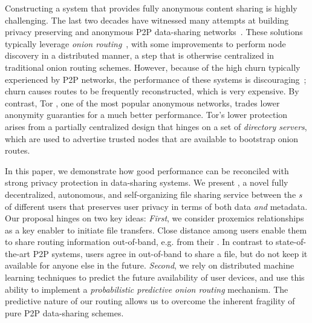 Constructing a system that provides fully anonymous content sharing is highly
challenging. The last two decades have witnessed many attempts at building privacy preserving and anonymous P2P data-sharing
networks~\cite{Clarke:2001,Gnunet2002,Freedman:2002,Nambiar:2006,Rennhard:2002}.
These solutions typically leverage \emph{onion
 routing}~\cite{Chaum:1981}, with some improvements to perform node
 discovery in a distributed manner, a step that is otherwise
centralized in traditional onion routing schemes. However, because of the high
churn typically experienced by P2P networks, the performance of these systems is
discouraging~\cite{LeBlond:2013}; churn causes routes to be frequently
reconstructed, which is very expensive. By contrast, Tor
\cite{Dingledine:2004}, one of the most popular anonymous networks,
trades lower anonymity guaranties for a much better performance. Tor's lower protection arises from
a partially centralized design that hinges on a set of \emph{directory
servers}, which are used to advertise trusted nodes that are available to bootstrap onion
routes. 

In this paper, we demonstrate how good performance can be reconciled with strong privacy protection in data-sharing systems. We present \name{}, a novel fully decentralized, autonomous,
and self-organizing file sharing service between the \squad{}\emph{s} of different users that preserves user privacy
in terms of both data \emph{and} metadata. Our proposal hinges on two key ideas: \emph{First}, we consider proxemics relationships as a key enabler to initiate file
transfers. Close distance among users enable them to share
routing information out-of-band, e.g. from their
\squad. In contrast to state-of-the-art P2P systems, users agree in \name out-of-band to share a file, but
do not keep it available for anyone else in the future. \emph{Second}, we
rely on distributed machine learning techniques to predict the future
availability of user devices, and use this ability to implement a \emph{probabilistic predictive onion routing} mechanism. The predictive nature of our routing allows us to overcome the inherent fragility of pure P2P data-sharing schemes.


